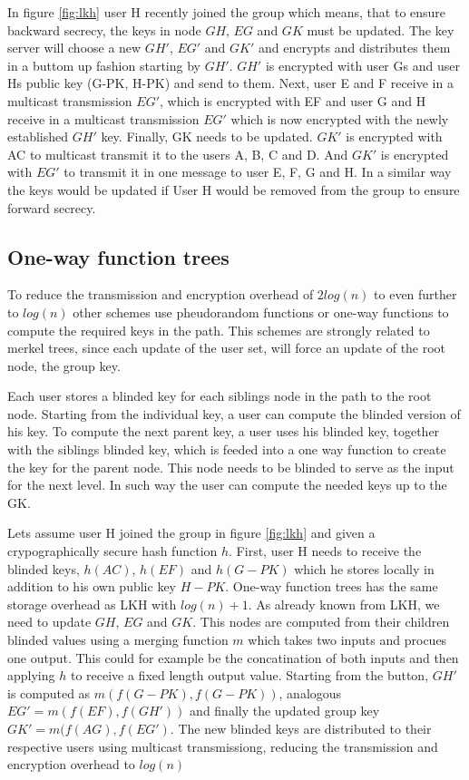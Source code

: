 In figure \ref{fig:lkh} user H recently joined the group which means, that to ensure backward secrecy, the keys in node $GH$, $EG$ and $GK$ must be updated. The key server will choose a new $GH'$, $EG'$ and $GK'$ and encrypts and distributes them in a buttom up fashion starting by $GH'$. $GH'$ is encrypted with user Gs and user Hs public key (G-PK, H-PK) and send to them. Next, user E and F receive in a multicast transmission $EG'$, which is encrypted with EF and user G and H receive in a multicast transmission $EG'$ which is now encrypted with the newly established $GH'$ key. Finally, GK needs to be updated. $GK'$ is encrypted with AC to multicast transmit it to the users A, B, C and D. And $GK'$ is encrypted with $EG'$ to transmit it in one message to user E, F, G and H. In a similar way the keys would be updated if User H would be removed from the group to ensure forward secrecy.   


\subsection{One-way function trees}
To reduce the transmission and encryption overhead of $2log(n)$ to even further to $log(n)$ other schemes use pheudorandom functions \cite{canetti1999multicast} or one-way functions \cite{sherman2003key} to compute the required keys in the path. This schemes are strongly related to merkel trees, since each update of the user set, will force an update of the root node, the group key.

Each user stores a blinded key for each siblings node in the path to the root node. Starting from the individual key, a user can compute the blinded version of his key. To compute the next parent key, a user uses his blinded key, together with the siblings blinded key, which is feeded into a one way function to create the key for the parent node. This node needs to be blinded to serve as the input for the next level. In such way the user can compute the needed keys up to the GK. 

Lets assume user H joined the group in figure \ref{fig:lkh} and given a crypographically secure hash function $h$. First, user H needs to receive the blinded keys, $h(AC)$, $h(EF)$ and $h(G-PK)$ which he stores locally in addition to his own public key $H-PK$. One-way function trees has the same storage overhead as LKH with $log(n) + 1$.  As already known from LKH, we need to update $GH$, $EG$ and $GK$. This nodes are computed from their children blinded values using a merging function $m$ which takes two inputs and procues one output. This could for example be the concatination of both inputs and then applying $h$ to receive a fixed length output value. Starting from the button,  $GH'$ is computed as $m(f(G-PK), f(G-PK))$, analogous $EG' = m(f(EF), f(GH'))$ and finally the updated group key $GK' = m(f(AG), f(EG')$. The new blinded keys are distributed to their respective users using multicast transmissiong, reducing the transmission and encryption overhead to $log(n)$


